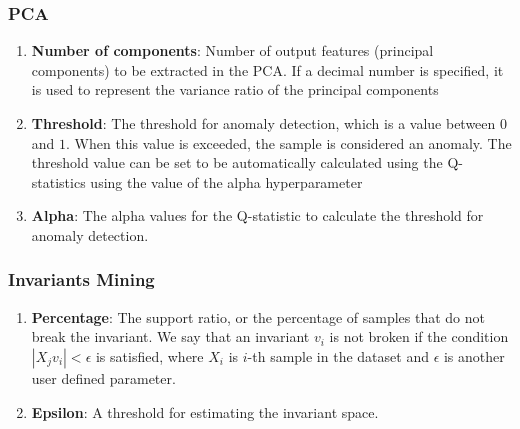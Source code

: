 \subsubsection*{PCA}
\begin{enumerate} 
\item \textbf{Number of components}: Number of output features (principal components) to be extracted in the PCA. If a decimal number is specified, it is used to represent the variance ratio of the principal components 
\item \textbf{Threshold}: The threshold for anomaly detection, which is a value between $0$ and $1$. When this value is exceeded, the sample is considered an anomaly. The threshold value can be set to be automatically calculated using the Q-statistics using the value of the alpha hyperparameter 
\item \textbf{Alpha}: The alpha values for the Q-statistic to calculate the threshold for anomaly detection. 
\end{enumerate}

\subsubsection*{Invariants Mining}
\begin{enumerate}
    \item \textbf{Percentage}: The support ratio, or the percentage of samples that do not break the invariant. We say that an invariant $v_i$ is not broken if the condition $|X_j v_i| < \epsilon $ is satisfied, where $X_i$ is $i$-th sample in the dataset and $\epsilon$ is another user defined parameter. 
    \item \textbf{Epsilon}: A threshold for estimating the invariant space.
\end{enumerate}

